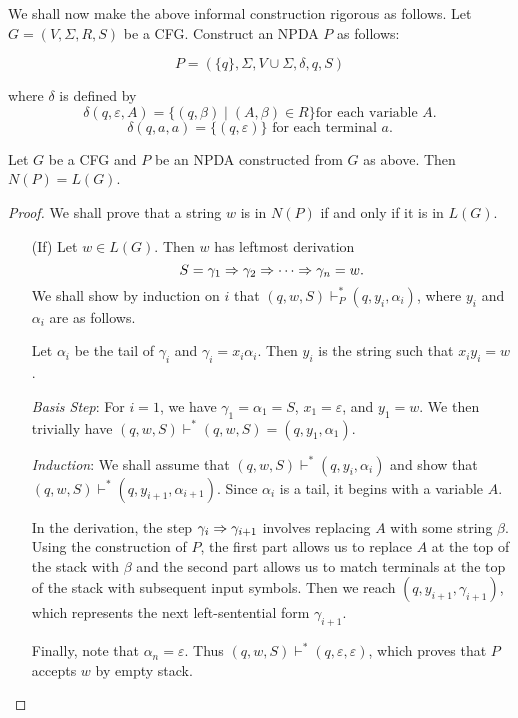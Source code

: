 \vspace{2mm}
We shall now make the above informal construction rigorous as follows.
Let $G=(V,\Sigma,R,S)$ be a CFG. Construct an NPDA $P$ as follows:

$$P=(\{q\}, \Sigma, V\cup \Sigma, \delta, q, S)$$

where $\delta$ is defined by
$$\delta(q,\varepsilon,A)=\{(q,\beta)\mid (A,\beta)\in R\} \text{for each variable $A$.}$$
$$\delta(q,a,a)=\{(q,\varepsilon)\}\text{ for each terminal $a$.}$$

\begin{lemma}
\label{CFGtoNPDAequivalence}
    Let $G$ be a CFG and $P$ be an NPDA constructed from $G$ as above. Then $N(P)=L(G)$.
\end{lemma}
\begin{proof}
    We shall prove that a string $w$ is in $N(P)$ if and only if it is in $L(G)$.
    \begin{itemize}
        \item[(If)] Let $w\in L(G)$. Then $w$ has leftmost derivation
        $$S=\gamma_1\Rightarrow\gamma_2\Rightarrow\cdots\Rightarrow\gamma_n=w.$$
        We shall show by induction on $i$ that $(q,w,S)\vdash^*_P(q,y_i,\alpha_i)$, where $y_i$ and $\alpha_i$ are as follows.
        
        Let $\alpha_i$ be the tail of $\gamma_i$ and $\gamma_i=x_i\alpha_i$. Then $y_i$ is the string such that $x_iy_i=w$.
        
        \vspace{2mm}
        \textit{Basis Step}: For $i=1$, we have $\gamma_1=\alpha_1=S$, $x_1=\varepsilon$, and $y_1=w$. We then trivially have $(q,w,S)\vdash^*(q,w,S)=(q,y_1,\alpha_1)$.
        
        \vspace{1mm}
        \textit{Induction}: We shall assume that $(q,w,S) \vdash^* (q,y_i,\alpha_i)$ and show that $(q,w,S) \vdash^* (q,y_{i+1},\alpha_{i+1})$. Since $\alpha_i$ is a tail, it begins with a variable $A$.
        
        In the derivation, the step $\gamma_i\Rightarrow\gamma_{i+1}$ involves replacing $A$ with some string $\beta$. Using the construction of $P$, the first part allows us to replace $A$ at the top of the stack with $\beta$ and the second part allows us to match terminals at the top of the stack with subsequent input symbols. Then we reach $(q,y_{i+1},\gamma_{i+1})$, which represents the next left-sentential form $\gamma_{i+1}$.
        
        Finally, note that $\alpha_n=\varepsilon$. Thus $(q,w,S)\vdash^*(q,\varepsilon,\varepsilon)$, which proves that $P$ accepts $w$ by empty stack.
        

\end{itemize}
\end{proof}
